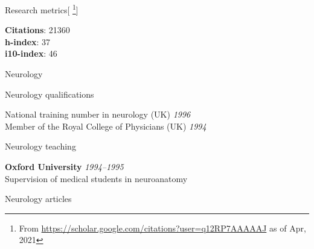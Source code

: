 \documentclass{cv}
\newcommand{\PlaceDateNote}[3]{{\bf #1} \hfill {\em #2} \\#3}
\begin{document}
\begin{cvSection}{Research metrics}[
    \footnote{ From
    \url{https://scholar.google.com/citations?user=q12RP7AAAAAJ} as of Apr,
2021}]

{\bf Citations}: 21360 \\
{\bf h-index}: 37 \\
{\bf i10-index}: 46

\end{cvSection}

\begin{cvSection}{Neurology}

\begin{cvSubSection}{Neurology qualifications}

National training number in neurology (UK) \hfill {\em 1996} \\
Member of the Royal College of Physicians (UK) \hfill {\em 1994}

\end{cvSubSection}

\begin{cvSubSection}{Neurology teaching}

\PlaceDateNote{Oxford University}{1994--1995}{
Supervision of medical students in neuroanatomy}

\end{cvSubSection}

\begin{cvSubSection}{Neurology articles}

\printbibliography[heading=none,
    keyword=neurology,
notkeyword=omit]

\end{cvSubSection}

\end{cvSection}
\end{document}

